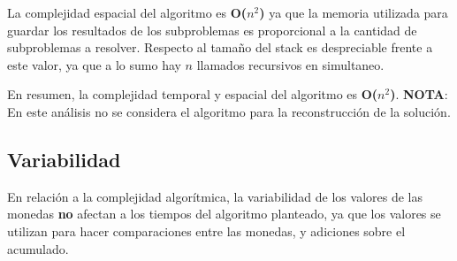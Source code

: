 La complejidad espacial del algoritmo es \textbf{O($n^2$)} ya que la memoria utilizada para guardar los resultados de los subproblemas es proporcional a la cantidad de subproblemas a resolver. Respecto al tamaño del stack es despreciable frente a este valor, ya que a lo sumo hay $n$ llamados recursivos en simultaneo.

En resumen, la complejidad temporal y espacial del algoritmo es \textbf{O($n^2$)}.
\vskip0.5cm
\textbf{NOTA}: En este análisis no se considera el algoritmo para la reconstrucción de la solución. 

\subsection{Variabilidad}

En relación a la complejidad algorítmica, la variabilidad de los valores de las monedas \textbf{no} afectan a los tiempos del algoritmo planteado, ya que los valores se utilizan para hacer comparaciones entre las monedas, y adiciones sobre el acumulado.

